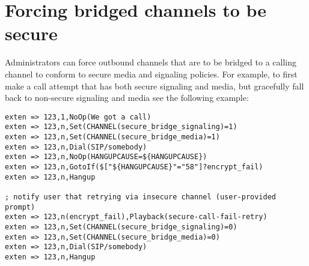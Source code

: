 \section{Forcing bridged channels to be secure}
Administrators can force outbound channels that are to be bridged to a calling channel to conform to secure media and signaling policies. For example, to first make a call attempt that has both secure signaling and media, but gracefully fall back to non-secure signaling and media see the following example:

\begin{astlisting}
\begin{verbatim}
exten => 123,1,NoOp(We got a call)
exten => 123,n,Set(CHANNEL(secure_bridge_signaling)=1)
exten => 123,n,Set(CHANNEL(secure_bridge_media)=1)
exten => 123,n,Dial(SIP/somebody)
exten => 123,n,NoOp(HANGUPCAUSE=${HANGUPCAUSE})
exten => 123,n,GotoIf($["${HANGUPCAUSE}"="58"]?encrypt_fail)
exten => 123,n,Hangup

; notify user that retrying via insecure channel (user-provided prompt)
exten => 123,n(encrypt_fail),Playback(secure-call-fail-retry)
exten => 123,n,Set(CHANNEL(secure_bridge_signaling)=0)
exten => 123,n,Set(CHANNEL(secure_bridge_media)=0)
exten => 123,n,Dial(SIP/somebody)
exten => 123,n,Hangup
\end{verbatim}
\end{astlisting}

